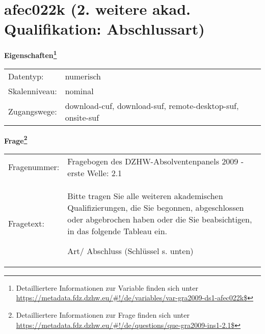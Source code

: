 
    \setcounter{footnote}{0}

    \vspace*{-1.8cm}
	\section{afec022k (2. weitere akad. Qualifikation: Abschlussart)}
	\label{section:afec022k}



    \vspace*{0.5cm}
    \noindent\textbf{Eigenschaften\footnote{Detailliertere Informationen zur Variable finden sich unter
		\url{https://metadata.fdz.dzhw.eu/\#!/de/variables/var-gra2009-ds1-afec022k$}}}\\
	\begin{tabularx}{\hsize}{@{}lX}
	Datentyp: & numerisch \\
	Skalenniveau: & nominal \\
	Zugangswege: &
	  download-cuf, 
	  download-suf, 
	  remote-desktop-suf, 
	  onsite-suf
 \\
    \end{tabularx}



				\vspace*{0.5cm}
                \noindent\textbf{Frage\footnote{Detailliertere Informationen zur Frage finden sich unter
		              \url{https://metadata.fdz.dzhw.eu/\#!/de/questions/que-gra2009-ins1-2.1$}}}\\
				\begin{tabularx}{\hsize}{@{}lX}
					Fragenummer: &
					  Fragebogen des DZHW-Absolventenpanels 2009 - erste Welle:
					  2.1
 \\
					Fragetext: & Bitte tragen Sie alle weiteren akademischen Qualifizierungen, die Sie begonnen, abgeschlossen oder abgebrochen haben oder die Sie beabsichtigen, in das folgende Tableau ein.\par  Art/ Abschluss (Schlüssel s. unten) \\
				\end{tabularx}





